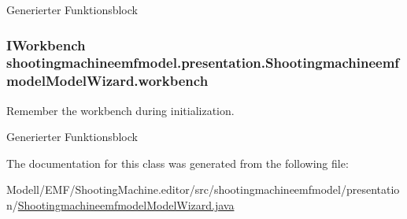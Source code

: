 Generierter Funktionsblock \hypertarget{classshootingmachineemfmodel_1_1presentation_1_1_shootingmachineemfmodel_model_wizard_a5170c9853972c24bd2ee4d11ad384fde}{
\subsubsection[{workbench}]{\setlength{\rightskip}{0pt plus 5cm}I\-Workbench shootingmachineemfmodel.\-presentation.\-Shootingmachineemfmodel\-Model\-Wizard.\-workbench\hspace{0.3cm}{\ttfamily [protected]}}}\label{classshootingmachineemfmodel_1_1presentation_1_1_shootingmachineemfmodel_model_wizard_a5170c9853972c24bd2ee4d11ad384fde}
Remember the workbench during initialization.

Generierter Funktionsblock 

The documentation for this class was generated from the following file\-:\begin{DoxyCompactItemize}
\item 
Modell/\-E\-M\-F/\-Shooting\-Machine.\-editor/src/shootingmachineemfmodel/presentation/\hyperlink{_shootingmachineemfmodel_model_wizard_8java}{Shootingmachineemfmodel\-Model\-Wizard.\-java}\end{DoxyCompactItemize}
